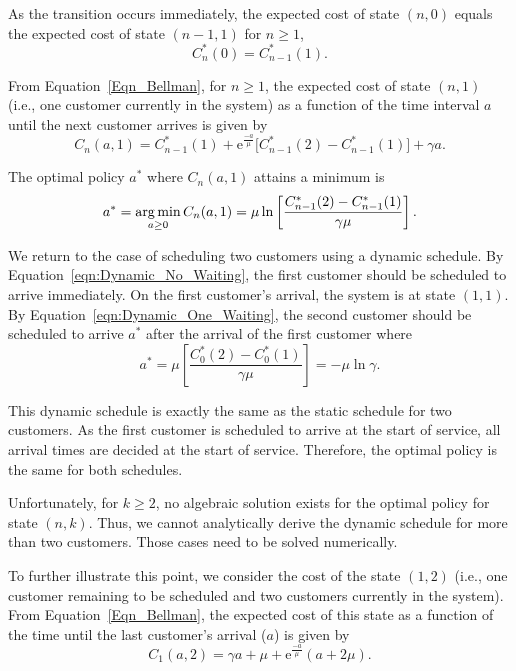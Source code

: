 As the transition occurs immediately, the expected cost of state $(n, 0)$ equals the expected cost of state $(n - 1, 1)$ for $n \geq 1$,
\begin{equation}
	C_{n}^{*} (0) = C_{n - 1}^{*} (1).
\end{equation}

From Equation~\ref{Eqn_Bellman}, for $n \geq 1$, the expected cost of state $(n, 1)$ (i.e., one customer currently in the system) as a function of the time interval $a$ until the next customer arrives is given by
\begin{equation}
	C_{n} (a, 1) = C_{n - 1}^{*} (1) + \mathrm{e}^{\frac{-a}{\mu}} \Big[ C_{n - 1}^{*} (2) - C_{n - 1}^{*} (1) \Big] + \gamma a.
\end{equation}

The optimal policy $a^{*}$ where $C_{n} (a, 1)$ attains a minimum is
\begin{equation}
	a^{*} = \operatorname*{arg\,min}_{a \geq 0} C_{n} (a, 1) = \mu \ln \left[ \frac{C_{n - 1}^{*} (2) - C_{n - 1}^{*} (1)}{\gamma \mu} \right].
	\label{eqn:Dynamic_One_Waiting}
\end{equation}

We return to the case of scheduling two customers using a dynamic schedule. By Equation~\ref{eqn:Dynamic_No_Waiting}, the first customer should be scheduled to arrive immediately. On the first customer's arrival, the system is at state $(1, 1)$. By Equation~\ref{eqn:Dynamic_One_Waiting}, the second customer should be scheduled to arrive $a^{*}$ after the arrival of the first customer where
\begin{equation}
	a^{*} = \mu \left[ \frac{C_{0}^{*} (2) - C_{0}^{*} (1)}{\gamma \mu} \right] = - \mu \ln \gamma.
\end{equation}

This dynamic schedule is exactly the same as the static schedule for two customers. As the first customer is scheduled to arrive at the start of service, all arrival times are decided at the start of service. Therefore, the optimal policy is the same for both schedules.

Unfortunately, for $k \geq 2$, no algebraic solution exists for the optimal policy for state $(n, k)$. Thus, we cannot analytically derive the dynamic schedule for more than two customers. Those cases need to be solved numerically.

To further illustrate this point, we consider the cost of the state $(1, 2)$ (i.e., one customer remaining to be scheduled and two customers currently in the system). From Equation~\ref{Eqn_Bellman}, the expected cost of this state as a function of the time until the last customer's arrival ($a$) is given by
\begin{equation}
	C_{1} (a, 2) = \gamma a + \mu + \mathrm{e}^{\frac{-a}{\mu}} (a + 2 \mu).
\end{equation}

